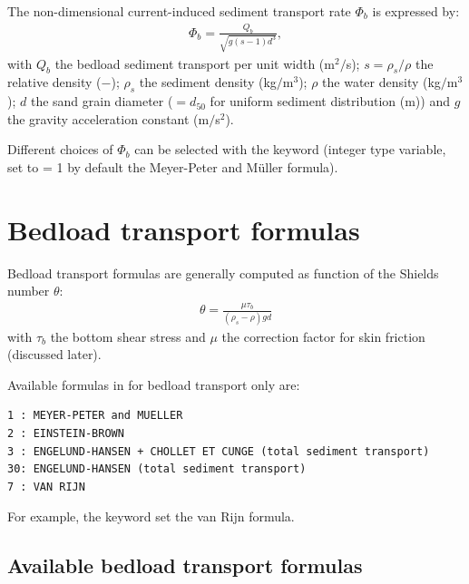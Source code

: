 The non-dimensional current-induced sediment transport rate $\Phi_b$ is expressed by:
\begin{align}
\Phi_b = \frac{Q_b}{\sqrt{g(s-1)d^3}},
\label{eq:Phis}
\end{align}
with $Q_b$ the bedload sediment transport per unit width (m$^2/$s); $s=\rho_s/\rho$ the relative density ($-$); $\rho_s$ the sediment density (kg$/$m$^3$); $\rho$ the water density (kg$/$m$^3$); $d$ the sand grain diameter ($=d_{50}$ for uniform sediment distribution (m)) and $g$ the gravity acceleration constant (m$/$s$^2$).

Different choices of $\Phi_b$ can be selected with the keyword  (integer type variable, set to {\ttfamily = 1} by default the Meyer-Peter and M\"uller formula).

\section{Bedload transport formulas}
Bedload transport formulas are generally computed as function of the Shields number $\theta$:
\begin{align}
\theta=\frac{\mu\tau_b}{(\rho_s-\rho)gd}  
\label{eq:shieldsp}
\end{align}
with $\tau_b$ the bottom shear stress and $\mu$ the correction factor for skin friction (discussed later).

Available formulas in \sisyphe{} for bedload transport only are:
\begin{lstlisting}[frame=trBL]
1 : MEYER-PETER and MUELLER
2 : EINSTEIN-BROWN 
3 : ENGELUND-HANSEN + CHOLLET ET CUNGE (total sediment transport)
30: ENGELUND-HANSEN (total sediment transport)
7 : VAN RIJN 
\end{lstlisting}
For example, the keyword  set the van Rijn formula.

\subsection{Available bedload transport formulas}
